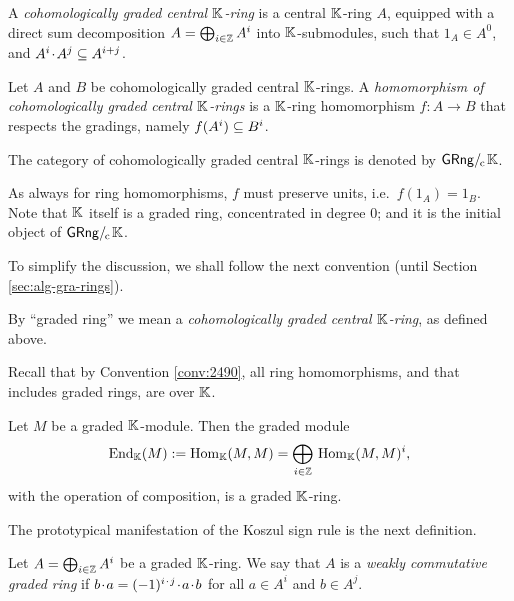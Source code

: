 \begin{dfn} \label{dfn:4103}
A {\em cohomologically graded central $\mathbb{K}$-ring}%
is a central $\mathbb{K}$-ring $A$, equipped with a direct sum decomposition
$A =  \bigoplus_{i \in \mathbb{Z}} A^i$
into $\mathbb{K}$-sub\-modules, such that $1_A \in A^0$, and 
$A^i \mspace{1.5mu}{\cdot}\mspace{1.5mu} A^j \subseteq A^{i + j}$.
\end{dfn}

\begin{dfn} \label{dfn:4104}
Let $A$ and $B$ be cohomologically graded central $\mathbb{K}$-rings. 
A {\em homomorphism of cohomologically graded central $\mathbb{K}$-rings} 
is a $\mathbb{K}$-ring homomorphism $f : A \to B$ that respects the gradings, 
namely $f(A^i) \subseteq B^i$.

The category of cohomologically graded central $\mathbb{K}$-rings is denoted by 
$\mathrm{\mathsf{GRng}} /_{\mspace{-2mu} \mathrm{c}} \mspace{2mu} \mathbb{K}$.  
\end{dfn}

As always for ring homomorphisms, $f$ must preserve units, i.e.\ 
$f(1_A) = 1_B$. Note that $\mathbb{K}$ itself is a graded ring, concentrated in degree 
$0$; and it is the initial object of $\mathrm{\mathsf{GRng}} /_{\mspace{-2mu} \mathrm{c}} \mspace{2mu} \mathbb{K}$.  

To simplify the discussion, we shall follow the next convention (until Section 
\ref{sec:alg-gra-rings}). 

\begin{conv} \label{conv:4126}
By ``graded ring'' we mean a {\em cohomologically graded central $\mathbb{K}$-ring}, 
as defined above. 
\end{conv}

Recall that by Convention \ref{conv:2490}, all ring homomorphisms, and that 
includes graded rings, are over $\mathbb{K}$.

\begin{exa} \label{exa:1705}
Let $M$ be a graded $\mathbb{K}$-module. Then the graded module
\[ \operatorname{End}_{\mathbb{K}}(M) := \operatorname{Hom}_{\mathbb{K}}(M, M) = 
\bigoplus_{i \in \mathbb{Z}} \, \operatorname{Hom}_{\mathbb{K}}(M, M)^i , \]
with the operation of composition, is a graded $\mathbb{K}$-ring. 
\end{exa}

The prototypical manifestation of the Koszul sign rule is the next 
definition. 

\begin{dfn} \label{dfn:4102}
Let $A = \bigoplus_{i \in \mathbb{Z}} A^i$ be a graded $\mathbb{K}$-ring.
We say that $A$ is a {\em weakly commutative graded ring}%
if 
$b \mspace{1.5mu}{\cdot}\mspace{1.5mu} a = (-1)^{i \mspace{1.5mu}{\cdot}\mspace{1.5mu} j} \mspace{1.5mu}{\cdot}\mspace{1.5mu} a \mspace{1.5mu}{\cdot}\mspace{1.5mu} b$
for all $a \in A^i$ and $b \in A^j$.
\end{dfn}

